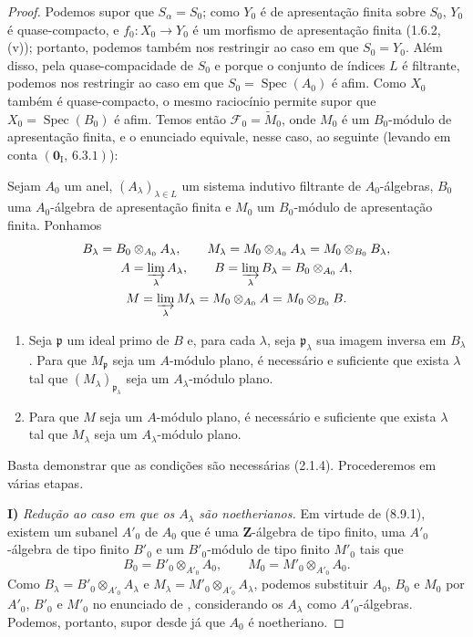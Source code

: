 \begin{proof}
Podemos supor que $S_\alpha=S_0$; como $Y_0$ é de apresentação finita sobre $S_0$, $Y_0$ é quase-compacto, e $f_0:X_0\to Y_0$ é um morfismo de apresentação finita (1.6.2, (v)); portanto, podemos também nos restringir ao caso em que $S_0=Y_0$. Além disso, pela quase-compacidade de $S_0$ e porque o conjunto de índices $L$ é filtrante, podemos nos restringir ao caso em que $S_0=\operatorname{Spec}(A_0)$ é afim. Como $X_0$ também é quase-compacto, o mesmo raciocínio permite supor que $X_0=\operatorname{Spec}(B_0)$ é afim. Temos então $\mathcal F_0=\widetilde M_0$, onde $M_0$ é um $B_0$-módulo de apresentação finita, e o enunciado  equivale, nesse caso, ao seguinte (levando em conta $(\mathbf 0_{\mathrm I},\,6.3.1)$):

\begin{corollary}[11.2.6.1]
\label{IV.11.2.6.1}
Sejam $A_0$ um anel, $(A_\lambda)_{\lambda\in L}$ um sistema indutivo filtrante de $A_0$-álgebras, $B_0$ uma $A_0$-álgebra de apresentação finita e $M_0$ um $B_0$-módulo de apresentação finita. Ponhamos
\[
\begin{gathered}
B_\lambda=B_0\otimes_{A_0}A_\lambda,\qquad
M_\lambda=M_0\otimes_{A_0}A_\lambda=M_0\otimes_{B_0}B_\lambda,\\
A=\varinjlim_\lambda A_\lambda,\qquad
B=\varinjlim_\lambda B_\lambda=B_0\otimes_{A_0}A,\\
M=\varinjlim_\lambda M_\lambda
=M_0\otimes_{A_0}A=M_0\otimes_{B_0}B.
\end{gathered}
\]
\begin{enumerate}[label=\emph{(\roman*)}]
\item Seja $\mathfrak p$ um ideal primo de $B$ e, para cada $\lambda$, seja $\mathfrak p_\lambda$ sua imagem inversa em $B_\lambda$. Para que $M_{\mathfrak p}$ seja um $A$-módulo plano, é necessário e suficiente que exista $\lambda$ tal que $(M_\lambda)_{\mathfrak p_\lambda}$ seja um $A_\lambda$-módulo plano.
\item Para que $M$ seja um $A$-módulo plano, é necessário e suficiente que exista $\lambda$ tal que $M_\lambda$ seja um $A_\lambda$-módulo plano.
\end{enumerate}
\end{corollary}

Basta demonstrar que as condições são necessárias (2.1.4). Procederemos em várias etapas.

\medskip
\noindent\textbf{I)} \emph{Redução ao caso em que os $A_\lambda$ são noetherianos.} Em virtude de (8.9.1), existem um subanel $A'_0$ de $A_0$ que é uma $\mathbf Z$-álgebra de tipo finito, uma $A'_0$-álgebra de tipo finito $B'_0$ e um $B'_0$-módulo de tipo finito $M'_0$ tais que
\[
B_0=B'_0\otimes_{A'_0}A_0,\qquad
M_0=M'_0\otimes_{A'_0}A_0.
\]
Como $B_\lambda=B'_0\otimes_{A'_0}A_\lambda$ e $M_\lambda=M'_0\otimes_{A'_0}A_\lambda$, podemos substituir $A_0$, $B_0$ e $M_0$ por $A'_0$, $B'_0$ e $M'_0$ no enunciado de , considerando os $A_\lambda$ como $A'_0$-álgebras. Podemos, portanto, supor desde já que $A_0$ é noetheriano.


\end{proof}
